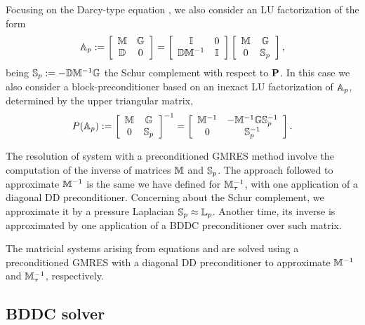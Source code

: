 Focusing on the Darcy-type equation , we also consider an LU factorization of the form
\begin{equation}
\label{SRK_p_mat}
\A_p:=\left[\begin{array}{cc}
\M&\G\\
\D&0
\end{array}\right]=\left[\begin{array}{cc}
\I&0\\
\D\M^{-1}&\I
\end{array}\right]\left[\begin{array}{cc}
\M&\G\\
0&\Sb_p
\end{array}\right],
\end{equation}
being $ \Sb_p:=-\D\M^{-1}\G$ the Schur complement with respect to $\P$. In this case we also consider a block-preconditioner based on an inexact LU factorization of $ \A_p $, determined by the upper triangular matrix,
\begin{equation}
\label{SRK_p_prec}
P(\A_p):=\left[\begin{array}{cc}
\M&\G\\
0&\Sb_p
\end{array}\right]^{-1}=\left[\begin{array}{cc}
\M^{-1}&-\M^{-1}\G\Sb_p^{-1}\\
0&\Sb_p^{-1}
\end{array}\right].
\end{equation}

The resolution of system  with a preconditioned GMRES method involve the computation of the inverse of matrices $ \M $ and $ \Sb_p $. The approach followed to approximate $ \M^{-1} $ is the same we have defined for $ \M_\tau^{-1} $, with one application of a diagonal DD preconditioner. Concerning about the Schur complement, we approximate it by a pressure Laplacian $ \Sb_p\approx\L_p $. Another time, its inverse is approximated by one application of a BDDC preconditioner over such matrix.

The matricial systems arising from equations  and  are solved using a preconditioned GMRES with a diagonal DD preconditioner to approximate $ \M^{-1} $ and $ \M_\tau^{-1} $, respectively.

\subsection{BDDC solver}

